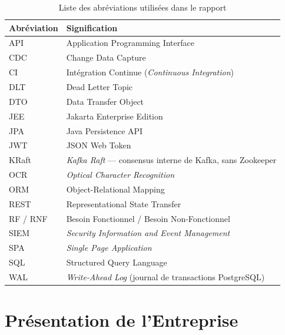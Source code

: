 \documentclass[12pt,a4paper,openany]{report}
\begin{document}
    \begin{longtable}{lP{10cm}}
      \caption{Liste des abr\'eviations utilis\'ees dans le rapport}\label{tab:abreviations}\\
      \toprule
      \textbf{Abr\'eviation} & \textbf{Signification} \\
      \midrule
      \endhead
      \bottomrule
      \endfoot
      API     & Application Programming Interface \\
      CDC     & Change Data Capture \\
      CI      & Int\'egration Continue (\textit{Continuous Integration}) \\
      DLT     & Dead Letter Topic \\
      DTO     & Data Transfer Object \\
      JEE     & Jakarta Enterprise Edition \\
      JPA     & Java Persistence API \\
      JWT     & JSON Web Token \\
      KRaft   & \textit{Kafka Raft} --- consensus interne de Kafka, sans Zookeeper \\
      OCR     & \textit{Optical Character Recognition} \\
      ORM     & Object-Relational Mapping \\
      REST    & Representational State Transfer \\
      RF / RNF & Besoin Fonctionnel / Besoin Non-Fonctionnel \\
      SIEM    & \textit{Security Information and Event Management} \\
      SPA     & \textit{Single Page Application} \\
      SQL     & Structured Query Language \\
      WAL     & \textit{Write-Ahead Log} (journal de transactions PostgreSQL) \\
    \end{longtable}

    \newpage
    \tableofcontents

    \newpage

    \chapter{Pr\'esentation de l'Entreprise}
    \label{chap:entreprise}
\end{document}
